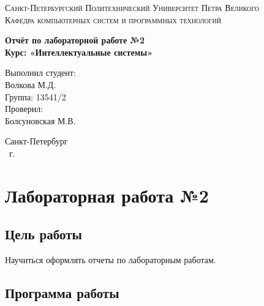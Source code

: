 \documentclass[14pt,a4paper,report]{report}
\begin{document}
\def\contentsname{Содержание}

\begin{titlepage}
\begin{center}
\textsc{Санкт-Петербургский Политехнический 
Университет Петра Великого\\[5mm]
Кафедра компьютерных систем и программных технологий}

\vfill

\textbf{Отчёт по лабораторной работе №2\\[3mm]
Курс: «Интеллектуальные системы»\\[41mm]
}
\end{center}

\hfill
\begin{minipage}{.4\textwidth}
Выполнил студент:\\[2mm] 
Волкова М.Д.\\
Группа: 13541/2\\[5mm]

Проверил:\\[2mm] 
Болсуновская М.В.
\end{minipage}
\vfill
\begin{center}
Санкт-Петербург\\ \the\year\ г.
\end{center}
\end{titlepage}

\tableofcontents
\clearpage

\chapter{Лабораторная работа №2}

\section{Цель работы}

Научиться оформлять отчеты по лабораторным работам.

\section{Программа работы}
\end{document}
